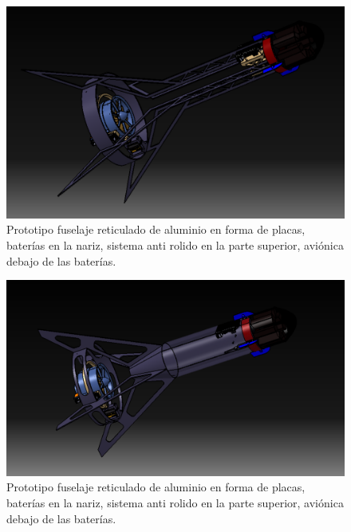 \begin{figure}[htb]
    \centering
    \includegraphics[width=\linewidth]{fig/design/2}
    \caption{Prototipo fuselaje reticulado de aluminio en forma de placas, baterías en la nariz, sistema anti
    rolido en la parte superior, aviónica debajo de las baterías.}
    \label{fig:design/2}
\end{figure}

\begin{figure}[htb]
    \centering
    \includegraphics[width=\linewidth]{fig/design/3}
    \caption{Prototipo fuselaje reticulado de aluminio en forma de placas, baterías en la nariz, sistema anti
    rolido en la parte superior, aviónica debajo de las baterías.}
    \label{fig:design/3}
\end{figure}

\null\newpage
\clearpage
